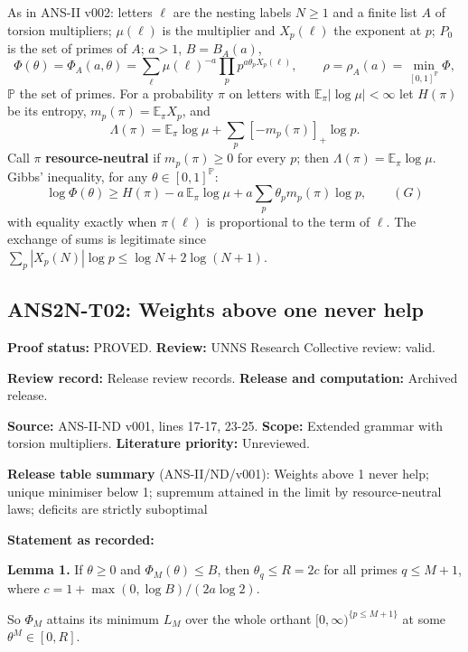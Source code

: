 \documentclass[
  11pt,
]{article}
\begin{document}
As in ANS-II v002: letters \(\ell\) are the nesting labels \(N\ge1\) and
a finite list \(A\) of torsion multipliers; \(\mu(\ell)\) is the
multiplier and \(X_p(\ell)\) the exponent at \(p\); \(P_0\) is the set
of primes of \(A\); \(a>1\), \(B=B_A(a)\),
\[\Phi(\theta)=\Phi_A(a,\theta)=\sum_\ell\mu(\ell)^{-a}\prod_pp^{a\theta_pX_p(\ell)},\qquad\rho=\rho_A(a)=\min_{[0,1]^{\mathbb P}}\Phi,\]
\(\mathbb P\) the set of primes. For a probability \(\pi\) on letters
with \(\mathbb E_\pi|\log\mu|<\infty\) let \(H(\pi)\) be its entropy,
\(m_p(\pi)=\mathbb E_\pi X_p\), and
\[\Lambda(\pi)=\mathbb E_\pi\log\mu+\sum_p[-m_p(\pi)]_+\log p .\] Call
\(\pi\) \textbf{resource-neutral} if \(m_p(\pi)\ge0\) for every \(p\);
then \(\Lambda(\pi)=\mathbb E_\pi\log\mu\). Gibbs' inequality, for any
\(\theta\in[0,1]^{\mathbb P}\):
\[\log\Phi(\theta)\ge H(\pi)-a\,\mathbb E_\pi\log\mu+a\sum_p\theta_pm_p(\pi)\log p,\qquad(G)\]
with equality exactly when \(\pi(\ell)\) is proportional to the term of
\(\ell\). The exchange of sums is legitimate since
\(\sum_p|X_p(N)|\log p\le\log N+2\log(N+1)\).

\hypertarget{ans2n-t02-weights-above-one-never-help}{%
\subsection{ANS2N-T02: Weights above one never
help}\label{ans2n-t02-weights-above-one-never-help}}

\textbf{Proof status:} PROVED. \textbf{Review:} UNNS Research Collective
review: valid.

\textbf{Review record:} Release review records. \textbf{Release and
computation:} Archived release.

\textbf{Source:} ANS-II-ND v001, lines 17-17, 23-25. \textbf{Scope:}
Extended grammar with torsion multipliers. \textbf{Literature priority:}
Unreviewed.

\textbf{Release table summary} (ANS-II/ND/v001): Weights above 1 never
help; unique minimiser below 1; supremum attained in the limit by
resource-neutral laws; deficits are strictly suboptimal

\textbf{Statement as recorded:}

\textbf{Lemma 1.} If \(\theta\ge0\) and \(\Phi_M(\theta)\le B\), then
\(\theta_q\le R=2c\) for all primes \(q\le M+1\), where
\(c=1+\max(0,\log B)/(2a\log2)\).

So \(\Phi_M\) attains its minimum \(L_M\) over the whole orthant
\([0,\infty)^{\{p\le M+1\}}\) at some \(\theta^M\in[0,R]\).
\end{document}
